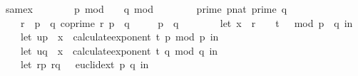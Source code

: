 \begin{isabellebody}
\endisatagproof
{\isafoldproof}%
%
\isadelimproof
\isanewline
%
\endisadelimproof
\isanewline
\isanewline
\isanewline
\isanewline
{}\isamarkupfalse%
\ same{\isacharunderscore}{\kern0pt}x{\isacharunderscore}{\kern0pt}{}{\isacharcolon}{\kern0pt}\isanewline
\ \ \ \isanewline
\ \ \ \ {\isachardoublequoteopen}p\ mod\ {}\ {\isacharequal}{\kern0pt}\ {}{\isachardoublequoteclose}\ {\isachardoublequoteopen}q\ mod\ {}\ {\isacharequal}{\kern0pt}\ {}{\isachardoublequoteclose}\ \isanewline
\ \ \ \ {\isachardoublequoteopen}prime\ {\isacharparenleft}{\kern0pt}p{\isacharcolon}{\kern0pt}{\isacharcolon}{\kern0pt}nat{\isacharparenright}{\kern0pt}{\isachardoublequoteclose}\ {\isachardoublequoteopen}prime\ q{\isachardoublequoteclose}\ \isanewline
\ \ \ \ {\isachardoublequoteopen}r\ {\isacharless}{\kern0pt}\ p\ {\isacharasterisk}{\kern0pt}\ q{\isachardoublequoteclose}\ {\isachardoublequoteopen}coprime\ r\ {\isacharparenleft}{\kern0pt}p\ {\isacharasterisk}{\kern0pt}\ q{\isacharparenright}{\kern0pt}{\isachardoublequoteclose}\ \isanewline
\ \ \ \ {\isachardoublequoteopen}p\ {\isasymnoteq}\ q{\isachardoublequoteclose}\isanewline
\ \ \ {\isachardoublequoteopen}\isanewline
\ \ \ \ {\isacharparenleft}{\kern0pt}let\ x\ {\isacharequal}{\kern0pt}\ r\ {\isacharcircum}{\kern0pt}\ {\isacharparenleft}{\kern0pt}{}\ {\isacharcircum}{\kern0pt}\ {\isacharparenleft}{\kern0pt}t\ {\isacharplus}{\kern0pt}\ {}{\isacharparenright}{\kern0pt}{\isacharparenright}{\kern0pt}\ mod\ {\isacharparenleft}{\kern0pt}p\ {\isacharasterisk}{\kern0pt}\ q{\isacharparenright}{\kern0pt}\ in\isanewline
\ \ \ \ let\ u{\isacharunderscore}{\kern0pt}p\ {\isacharequal}{\kern0pt}\ x\ {\isacharcircum}{\kern0pt}\ {\isacharparenleft}{\kern0pt}calculate{\isacharunderscore}{\kern0pt}exponent\ t\ p{\isacharparenright}{\kern0pt}\ mod\ p\ in\isanewline
\ \ \ \ let\ u{\isacharunderscore}{\kern0pt}q\ {\isacharequal}{\kern0pt}\ x\ {\isacharcircum}{\kern0pt}\ {\isacharparenleft}{\kern0pt}calculate{\isacharunderscore}{\kern0pt}exponent\ t\ q{\isacharparenright}{\kern0pt}\ mod\ q\ in\isanewline
\ \ \ \ let\ {\isacharparenleft}{\kern0pt}{\isacharparenleft}{\kern0pt}r{\isacharunderscore}{\kern0pt}p{\isacharcomma}{\kern0pt}\ r{\isacharunderscore}{\kern0pt}q{\isacharparenright}{\kern0pt}{\isacharcomma}{\kern0pt}\ {\isacharunderscore}{\kern0pt}{\isacharparenright}{\kern0pt}\ {\isacharequal}{\kern0pt}\ euclid{\isacharunderscore}{\kern0pt}ext\ p\ q\ in\isanewline

\end{isabellebody}
